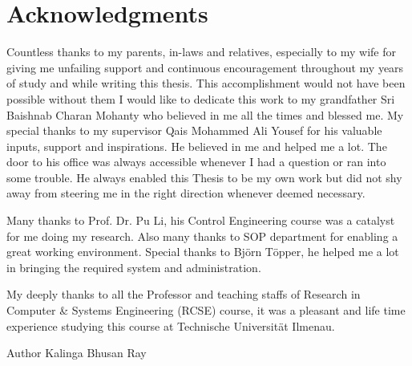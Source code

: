
\cleardoublepage
\setcounter{savepage}{\thepage}
\begin{abstractpage}

\end{abstractpage}

% 

\cleardoublepage

\section*{Acknowledgments}
Countless thanks to my parents, in-laws and relatives, especially to my wife
for giving me unfailing support and continuous encouragement throughout my 
years of study and while writing this thesis. This accomplishment would not 
have been possible without them I would like to dedicate this work to my 
grandfather Sri Baishnab Charan Mohanty who believed in me all the times
and blessed me.
\baselineskip
My special thanks to my supervisor Qais Mohammed Ali Yousef for his valuable
inputs, support and inspirations. He believed in me and helped me a lot.
The door to his office was always accessible whenever I had a question 
or ran into some trouble. He always enabled this Thesis to be my own work 
but did not shy away from steering me in the right direction whenever deemed necessary.
\baselineskip
\par
Many thanks to Prof. Dr. Pu Li, his Control Engineering course was a 
catalyst for me doing my research. Also many thanks to SOP department for 
enabling a great working environment. Special thanks to Bj{\"o}rn T{\"o}pper, 
he helped me a lot in bringing the required system and administration.
\baselineskip
\par
My deeply thanks to all the Professor and teaching staffs of Research 
in Computer \& Systems Engineering (RCSE) course, it was a pleasant and life 
time experience studying this course at Technische Universit{\"a}t Ilmenau.
\baselineskip
\par
Author
Kalinga Bhusan Ray


